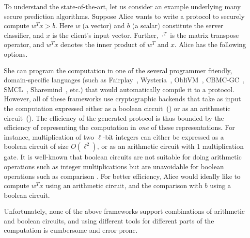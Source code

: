 To understand the
state-of-the-art, let us consider an example underlying many
secure prediction algorithms. Suppose Alice wants to write
a \mpc protocol to securely
compute $w^Tx >b$. Here $w$ (a vector) and $b$ (a scalar) constitute
the server classifier, and $x$ is the client's input vector. Further,
$\cdot^{T}$ is the matrix transpose operator, and $w^Tx$ denotes the
inner product of  $w^T$ and $x$. Alice has the following options.


She can program the computation in one of the several programmer
friendly, domain-specific languages (such
as Fairplay~\cite{fairplay}, Wysteria~\cite{wysteria},
ObliVM~\cite{oblivm}, CBMC-GC~\cite{cbmcgc}, SMCL~\cite{smcl},
Sharemind~\cite{sharemind}, \cite{lambdaps} etc.) that would
automatically compile it to a \mpc protocol. However, all of these
frameworks use cryptographic backends that take as input
the computation expressed either as a boolean
circuit~(\cite{yao,gmw}) or as an arithmetic circuit~(\cite{sss,viff,gentry}). 
%
%
The efficiency of the generated \mpc protocol is thus bounded by the
efficiency of representing the computation in \emph{one} of
these representations. For instance, multiplication of two
$\ell$-bit integers can either be expressed as a boolean circuit of
size $O(\ell^2)$, or as an arithmetic circuit with 1 multiplication
gate.
It is well-known that boolean circuits are not suitable for doing arithmetic operations such as integer multiplications but are unavoidable for boolean operations such as comparison \cite{aby,tasty,autoS,secureml,minionn,chameleon}.
%
For better efficiency, Alice would ideally like to compute
$w^Tx$ using an arithmetic circuit, and the comparison with $b$ using
a boolean circuit.
%

Unfortunately, none of the above frameworks support combinations of
arithmetic and boolean circuits, and using different tools for
different parts of the computation is cumbersome and error-prone.


